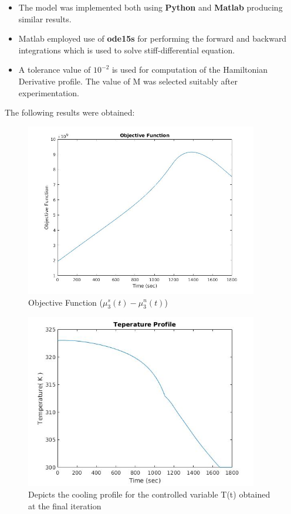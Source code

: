\begin{itemize}
\item The model was implemented both using \textbf{Python} and \textbf{Matlab} producing similar results. 
\item Matlab employed use of \textbf{ode15s} for performing the forward and backward integrations which is used to solve stiff-differential equation. 
\item A tolerance value of $10^{-2}$ is used for computation of the Hamiltonian Derivative profile. The value of M was selected suitably after experimentation. 
\end{itemize}
The following results were obtained: \\
\begin{figure}[h!] 
\caption{Objective Function ($\mu_{3}^{s}(t) - \mu_{3}^{n}(t)$)}
\begin{center}
\includegraphics[width=4in]{objective.jpg}
\end{center}
\end{figure}
\begin{figure}[h!] 
\caption{Depicts the cooling profile for the controlled variable T(t) obtained at the final iteration}
\begin{center}
\includegraphics[width=4in]{temp.jpg}
\end{center}
\end{figure}
